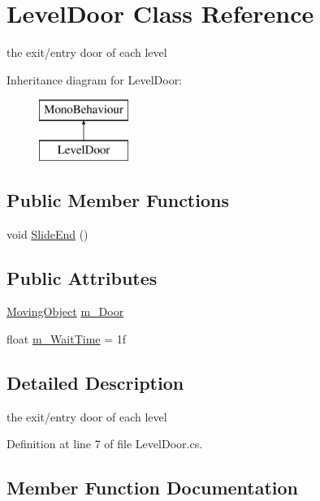 \hypertarget{class_level_door}{}\section{Level\+Door Class Reference}
\label{class_level_door}


the exit/entry door of each level  


Inheritance diagram for Level\+Door\+:\begin{figure}[H]
\begin{center}
\leavevmode
\includegraphics[height=2.000000cm]{class_level_door}
\end{center}
\end{figure}
\subsection*{Public Member Functions}
\begin{DoxyCompactItemize}
\item 
void \mbox{\hyperlink{class_level_door_a92ddf3ad44e460f18d980c40d08351c6}{Slide\+End}} ()
\end{DoxyCompactItemize}
\subsection*{Public Attributes}
\begin{DoxyCompactItemize}
\item 
\mbox{\hyperlink{class_moving_object}{Moving\+Object}} \mbox{\hyperlink{class_level_door_a1792787237881d83a0cc4d69ee829ce3}{m\+\_\+\+Door}}
\item 
float \mbox{\hyperlink{class_level_door_a60e576366670cb9134d840c012057384}{m\+\_\+\+Wait\+Time}} = 1f
\end{DoxyCompactItemize}


\subsection{Detailed Description}
the exit/entry door of each level 



Definition at line 7 of file Level\+Door.\+cs.



\subsection{Member Function Documentation}
\mbox{\label{class_level_door_a92ddf3ad44e460f18d980c40d08351c6}} 

